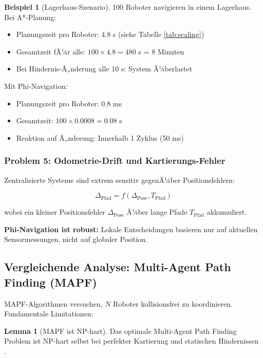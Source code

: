 ﻿\documentclass[a4paper,12pt]{article}
\theoremstyle{definition}
\newtheorem{beispiel}{Beispiel}
\newtheorem{lemma}{Lemma}
\begin{document}
\begin{beispiel}[Lagerhaus-Szenario]
	100 Roboter navigieren in einem Lagerhaus. Bei A*-Planung:
	\begin{itemize}
		\item Planungszeit pro Roboter: 4.8 s (siehe Tabelle \ref{tab:scaling})
		\item Gesamtzeit fÃ¼r alle: $100 \times 4.8 = 480$ s = 8 Minuten
		\item Bei Hindernis-Ã„nderung alle 10 s: System Ã¼berlastet
	\end{itemize}
	
	Mit Phi-Navigation:
	\begin{itemize}
		\item Planungszeit pro Roboter: 0.8 ms
		\item Gesamtzeit: $100 \times 0.0008 = 0.08$ s
		\item Reaktion auf Ã„nderung: Innerhalb 1 Zyklus (50 ms)
	\end{itemize}
\end{beispiel}

\subsubsection{Problem 5: Odometrie-Drift und Kartierungs-Fehler}

Zentralisierte Systeme sind extrem sensitiv gegenÃ¼ber Positionsfehlern:

\begin{equation}
\Delta_{\text{Pfad}} = f(\Delta_{\text{Pose}}, T_{\text{Pfad}})
\end{equation}

wobei ein kleiner Positionsfehler $\Delta_{\text{Pose}}$ Ã¼ber lange Pfade $T_{\text{Pfad}}$ akkumuliert.

\textbf{Phi-Navigation ist robust:} Lokale Entscheidungen basieren nur auf aktuellen Sensormessungen, nicht auf globaler Position.

\subsection{Vergleichende Analyse: Multi-Agent Path Finding (MAPF)}

MAPF-Algorithmen versuchen, $N$ Roboter kollisionsfrei zu koordinieren. Fundamentale Limitationen:

\begin{lemma}[MAPF ist NP-hart]
	Das optimale Multi-Agent Path Finding Problem ist NP-hart selbst bei perfekter Kartierung und statischen Hindernissen \cite{lavalle}.
\end{lemma}
\end{document}
